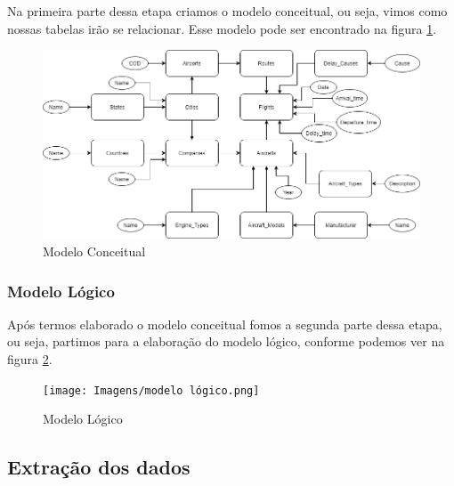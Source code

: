 \documentclass{article}
\begin{document}
	Na primeira parte dessa etapa criamos o modelo conceitual, ou seja, vimos como nossas tabelas irão se relacionar. Esse modelo pode ser encontrado na figura \ref{conceitual}.
	\begin{figure}
		\centering
		\includegraphics[scale = 0.5]{Imagens/modelo conceitual.png}
		\caption{Modelo Conceitual}
		\label{conceitual}
	\end{figure}
	
	\subsubsection{Modelo Lógico}
	
	Após termos elaborado o modelo conceitual fomos a segunda parte dessa etapa, ou seja, partimos para a elaboração do modelo lógico, conforme podemos ver na figura \ref{lógico}.
	\begin{figure}
		\centering
		\texttt{[image: Imagens/modelo lógico.png]}
		\caption{Modelo Lógico}
		\label{lógico}
	\end{figure}
	
	\subsection{Extração dos dados}
	
\end{document}
